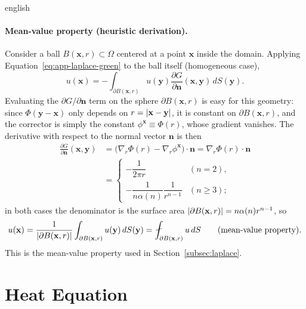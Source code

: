 \documentclass[0000.tex]{subfiles}
\begin{document}
\begin{hyphenrules}{english}
\paragraph{Mean-value property (heuristic derivation).}
Consider a ball $B(\mathbf{x},r)\subset\Omega$ centered at a point $\mathbf{x}$ inside the domain. Applying
Equation~\eqref{eq:app-laplace-green} to the ball itself (homogeneous case),
\begin{equation}
  u(\mathbf{x})=-\int_{\partial B(\mathbf{x},r)}u(\mathbf{y})\frac{\partial G}{\partial\mathbf{n}}(\mathbf{x},\mathbf{y})\,d S(\mathbf{y}).
  \label{eq:mvp-1}
\end{equation}
Evaluating the $\partial G/\partial\mathbf{n}$ term on the sphere $\partial B(\mathbf{x},r)$ is easy for this geometry:
since $\Phi(\mathbf{y}-\mathbf{x})$ only depends on $r=\left\lvert \mathbf{x}-\mathbf{y} \right\rvert$, it is constant on $\partial B(\mathbf{x},r)$, and the
corrector is simply the constant $\phi^{\mathbf{x}}\equiv\Phi(r)$, whose gradient vanishes. The derivative with
respect to the normal vector $\mathbf{n}$ is then
\begin{align}
  \frac{\partial G}{\partial\mathbf{n}}(\mathbf{x},\mathbf{y})
    &=\big(\nabla_r\Phi(r)-\nabla_r\phi^{\mathbf{x}}\big)\cdot\mathbf{n}=\nabla_r\Phi(r)\cdot\mathbf{n} \label{eq:mvp-2}\\
    &=\begin{cases}
        -\dfrac{1}{2\pi r} & (n=2),\\[2mm]
        -\dfrac{1}{n\alpha(n)}\dfrac{1}{r^{n-1}} & (n\ge3);
      \end{cases} \label{eq:mvp-3}
\end{align}
in both cases the denominator is the surface area $\left\lvert \partial B(\mathbf{x},r) \right\rvert=n\alpha(n)r^{n-1}$, so
\begin{equation}
  u(\mathbf{x})=\frac{1}{\abs{\partial B(\mathbf{x},r)}}\int_{\partial B(\mathbf{x},r)}u(\mathbf{y})\,d S(\mathbf{y})
  =\fint_{\partial B(\mathbf{x},r)}u\,d S \qquad\text{(mean-value property)}.
  \label{eq:app-mvp}
\end{equation}
This is the mean-value property used in Section~\ref{subsec:laplace}.

\section{Heat Equation}\label{app-sec:heat}


\end{hyphenrules}
\end{document}
